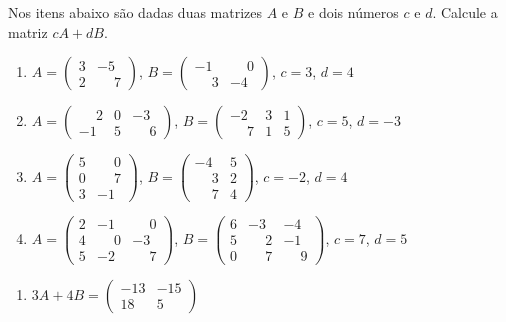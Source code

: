 \documentclass[12pt]{exam}
\begin{document}
\begin{exercicio}
    Nos itens abaixo são dadas duas matrizes $A$ e $B$ e dois números $c$ e $d$. Calcule a matriz $cA + dB$.
    \begin{enumerate}[label={\alph*})]
        \item $A = \begin{pmatrix}3 & -5\\2 & \phantom{-} 7\end{pmatrix}$, $B = \begin{pmatrix}-1 & \phantom{-} 0\\\phantom{-} 3 & -4\end{pmatrix}$, $c = 3$, $d = 4$
        \item $A = \begin{pmatrix}\phantom{-} 2 & 0 & -3\\-1 & 5 & \phantom{-} 6\end{pmatrix}$, $B = \begin{pmatrix}-2 & 3 & 1\\\phantom{-} 7 & 1 & 5\end{pmatrix}$, $c = 5$, $d = -3$
        \item $A = \begin{pmatrix}5 & \phantom{-} 0\\0 & \phantom{-} 7\\3 & -1\end{pmatrix}$, $B = \begin{pmatrix}-4 & 5\\\phantom{-} 3 & 2\\\phantom{-} 7 & 4\end{pmatrix}$, $c = -2$, $d = 4$
        \item $A = \begin{pmatrix}2 & -1 & \phantom{-} 0\\4 & \phantom{-} 0 & -3\\5 & -2 & \phantom{-} 7\end{pmatrix}$, $B = \begin{pmatrix}6 & -3 & -4\\5 & \phantom{-} 2 & -1\\0 & \phantom{-} 7 & \phantom{-} 9\end{pmatrix}$, $c = 7$, $d = 5$
    \end{enumerate}
    \begin{solucao}
        \begin{enumerate}[label={\alph*})]
            \item $3A + 4B = \begin{pmatrix}-13 & -15\\18 & 5\end{pmatrix}$

\end{enumerate}
\end{solucao}
\end{exercicio}
\end{document}
